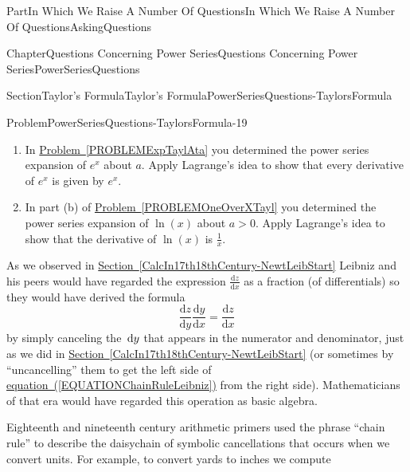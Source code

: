 \documentclass[oneside,10pt,]{book}
\newcommand{\xreffont}{\relax}
\numberwithin{equation}{part}
\newcommand{\dx}[1]{\,{\rm d}#1}
\newcommand{\dfdx}[2]{\frac{\text{d}{#1}}{\text{d}{#2}}}
\newcommand{\amp}{&}
\begin{document}
\begin{partptx}{Part}{In Which We Raise A Number Of Questions}{}{In Which We Raise A Number Of Questions}{}{}{AskingQuestions}
\begin{chapterptx}{Chapter}{Questions Concerning Power Series}{}{Questions Concerning Power Series}{}{}{PowerSeriesQuestions}
\begin{sectionptx}{Section}{Taylor's Formula}{}{Taylor's Formula}{}{}{PowerSeriesQuestions-TaylorsFormula}
\begin{problem}{Problem}{}{PowerSeriesQuestions-TaylorsFormula-19}
\begin{enumerate}[font=\bfseries,label=(\alph*),ref=\alph*]
\begin{align*}
\sin (x)=\sin (a)+\amp{}\cos\left(a\right)\left(x-a\right)\\
\amp{}-\frac{1}{2!}\sin
\left(a\right){\left(x-a\right)}^2\\
\amp{}\ \ \ -\frac{1}{3!}\cos
\left(a\right){\left(x-a\right)}^3\\
\amp{}\ \ \ \ \ \ +\frac{1}{4!}\sin
\left(a\right){\left(x-a\right)}^4\\
\amp{}\ \ \ \ \ \ \ \ \  +\frac{1}{5!}\cos
\left(a\right){\left(x-a\right)}^5+\cdots.
\end{align*}
%
\par
Apply Lagrange's idea to determine the \(n\)th derivative of \(\sin x\). Compare with the results you get from differentiating \(\sin x\) directly.%
\item{}In \hyperref[PROBLEMExpTaylAta]{Problem~{\xreffont\ref{PROBLEMExpTaylAta}}} you determined the power series expansion of \(e^x\) about \(a\).  Apply Lagrange's idea to show that every derivative of \(e^x\) is given by \(e^x\).%
\item{}In part (b) of \hyperref[PROBLEMOneOverXTayl]{Problem~{\xreffont\ref{PROBLEMOneOverXTayl}}} you determined the power series expansion of \(\ln(x)\) about \(a>0\). Apply Lagrange's idea to show that the derivative of \(\ln (x)\) is \(\frac{1}{x}\).%
\end{enumerate}%
\end{problem}
As we observed in \hyperref[CalcIn17th18thCentury-NewtLeibStart]{Section~{\xreffont\ref{CalcIn17th18thCentury-NewtLeibStart}}} Leibniz and his peers would have regarded the expression \(\dfdx{z}{x}\) as a fraction (of differentials) so they would have derived the formula%
\begin{equation}
\dfdx{z}{y}\dfdx{y}{x}=\dfdx{z}{x}\label{EQUATIONChainRuleLeibniz}
\end{equation}
by simply canceling the \(\dx{y}\) that appears in the numerator and denominator, just as we did in \hyperref[CalcIn17th18thCentury-NewtLeibStart]{Section~{\xreffont\ref{CalcIn17th18thCentury-NewtLeibStart}}} (or sometimes by ``uncancelling'' them to get the left side of \hyperref[EQUATIONChainRuleLeibniz]{equation~({\xreffont\ref{EQUATIONChainRuleLeibniz}})} from the right side).  Mathematicians of that era would have regarded this operation as basic algebra.%
\par
Eighteenth and nineteenth century arithmetic primers used the phrase ``chain rule'' to describe the daisy\textendash{}chain of symbolic cancellations that occurs when we convert units. For example, to convert yards to inches we compute%

\end{sectionptx}
\end{chapterptx}
\end{partptx}
\end{document}
